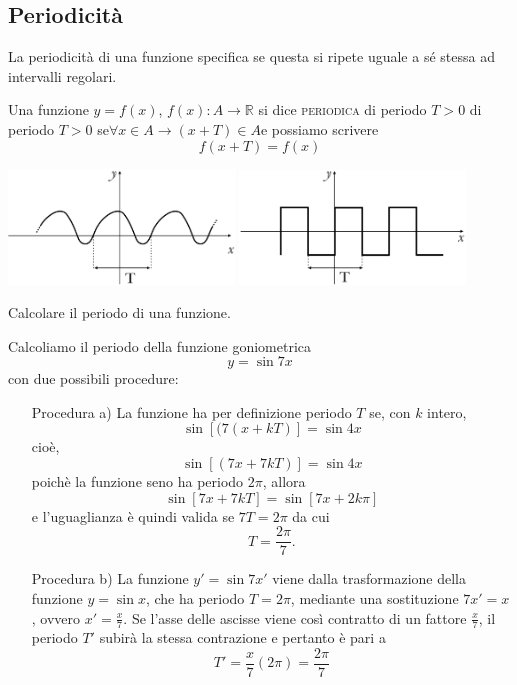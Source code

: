 \subsection{Periodicità}
La periodicità di una funzione specifica se questa si ripete uguale a sé 
stessa ad intervalli regolari.

\begin{definizione}
Una funzione \(y=f(x)\), \(f(x): A\to \mathbb{R}\) si dice \textsc{periodica} di 
periodo \(T>0\) di periodo \(T>0\) se\(\forall x\in A\rightarrow (x+T)\in A\)e 
possiamo scrivere 
 \[f(x+T)=f(x)\]
\end{definizione}

\begin{center}
  \includegraphics[width=0.45\textwidth]{img/funz_11a.png} \quad 
  \includegraphics[width=0.45\textwidth]{img/funz_11b.png}
\end{center}

\begin{esempio} Calcolare il periodo di una funzione.

Calcoliamo il periodo della  funzione goniometrica 
\[y=\sin{7x}\] 
con due possibili procedure:
\begin{itemize}
  \item[\textsf{Procedura a)}] La funzione ha per definizione periodo 
\(T\) se, con \(k\) intero,
\[\sin[(7(x+kT)]=\sin4x\]
cioè,
\[\sin[(7x+7kT)]=\sin4x\]
poichè la funzione seno ha periodo \(2\pi\), allora
\[\sin[7x+7kT]=\sin[7x+2k\pi]\]
e l'uguaglianza è quindi valida se \(7T=2\pi\) da cui
\[T=\frac{2\pi}{7}.\]

  \item[\textsf{Procedura b)}] La funzione \(y'=\sin7x'\) viene dalla 
trasformazione della funzione \(y=\sin x\), che ha periodo \(T=2\pi\), mediante 
una sostituzione \(7x'=x\), ovvero \(x'=\frac{x}{7}\). Se l'asse delle ascisse 
viene così contratto di un fattore \(\frac{x}{7}\), il periodo \(T'\) subirà la 
stessa contrazione e pertanto è pari a \[T'=\frac{x}{7}(2\pi)=\frac{2\pi}{7}\]
\end{itemize}
\end{esempio}

